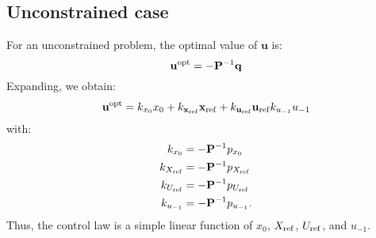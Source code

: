 \documentclass[a4paper,12pt,fleqn]{article}
\newcommand{\PQP}{\mathbf{P}}
\newcommand{\qQP}{\mathbf{q}}
\newcommand{\varxvec}{\mathbf{x}}
\newcommand{\varuvec}{\mathbf{u}}
\newcommand{\baru}{u_{-1}}
\begin{document}
\subsection{Unconstrained case}
For an unconstrained problem, the optimal value of $\varuvec$ is:
\begin{equation}
 \varuvec^{\rm opt} = -\PQP^{-1}\qQP
\end{equation}
Expanding, we obtain:
\begin{equation}
 \varuvec^{\rm opt} = k_{x_0} x_0 + k_{\varxvec_{\rm ref}}\varxvec_{\rm ref} + k_{\varuvec_{\rm ref}} \varuvec_{\rm ref} k_{\baru} \baru
\end{equation}
with:
\begin{subequations}
\begin{align}
k_{x_0} &= -\PQP^{-1}p_{x_0}\\
k_{X_{\rm ref}} &= -\PQP^{-1}p_{X_{\rm ref}}\\
k_{U_{\rm ref}} &= -\PQP^{-1}p_{U_{\rm ref}}\\
k_{\baru} &= -\PQP^{-1}p_{\baru}.
\end{align}
\end{subequations}
Thus, the control law is a simple linear function of $x_0$, $X_{\rm ref}$, $U_{\rm ref}$, and $u_{-1}$.
\end{document}
